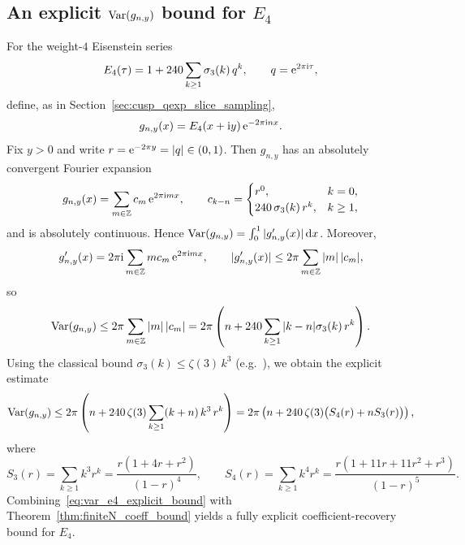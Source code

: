 \subsection{An explicit \texorpdfstring{$\mathrm{Var}(g_{n,y})$}{Var(g\_n,y)} bound for \texorpdfstring{$E_4$}{E4}}
\label{app:variation_bound_e4_explicit}

For the weight-$4$ Eisenstein series
\begin{equation}
E_4(\tau)=1+240\sum_{k\ge 1}\sigma_3(k)\,q^k,\qquad q=\mathrm{e}^{2\pi\mathrm{i}\tau},
\end{equation}
define, as in Section~\ref{sec:cusp_qexp_slice_sampling},
\begin{equation}
g_{n,y}(x)=E_4(x+\mathrm{i} y)\,\mathrm{e}^{-2\pi\mathrm{i} n x}.
\end{equation}
Fix $y>0$ and write $r=\mathrm{e}^{-2\pi y}=|q|\in(0,1)$. Then $g_{n,y}$ has an absolutely convergent Fourier expansion
\begin{equation}
g_{n,y}(x)=\sum_{m\in\mathbb{Z}} c_m\,\mathrm{e}^{2\pi\mathrm{i} m x},
\qquad
c_{k-n}=
\begin{cases}
r^0, & k=0,\\
240\,\sigma_3(k)\,r^k, & k\ge 1,
\end{cases}
\end{equation}
and is absolutely continuous. Hence $\mathrm{Var}(g_{n,y})=\int_0^1|g_{n,y}'(x)|\,\mathrm{d} x$.
Moreover,
\begin{equation}
g_{n,y}'(x)=2\pi\mathrm{i} \sum_{m\in\mathbb{Z}} m c_m\,\mathrm{e}^{2\pi\mathrm{i} m x},
\qquad
|g_{n,y}'(x)|\le 2\pi \sum_{m\in\mathbb{Z}} |m|\,|c_m|,
\end{equation}
so
\begin{equation}
\label{eq:var_bound_by_coeff_sum}
\mathrm{Var}(g_{n,y})
\le 2\pi \sum_{m\in\mathbb{Z}} |m|\,|c_m|
 = 2\pi\left(n + 240\sum_{k\ge 1}|k-n|\sigma_3(k)\,r^k\right).
\end{equation}
Using the classical bound $\sigma_3(k)\le \zeta(3)\,k^3$ (e.g.\ \cite{Apostol1990}), we obtain the explicit estimate
\begin{equation}
\label{eq:var_e4_explicit_bound}
\mathrm{Var}(g_{n,y})
\le 2\pi\left(
n
 +240\,\zeta(3)\sum_{k\ge 1}(k+n)\,k^3\,r^k
\right)
=2\pi\left(
n
 +240\,\zeta(3)\big(S_4(r)+nS_3(r)\big)
\right),
\end{equation}
where
\begin{equation}
S_3(r)=\sum_{k\ge 1}k^3r^k=\frac{r(1+4r+r^2)}{(1-r)^4},
\qquad
S_4(r)=\sum_{k\ge 1}k^4r^k=\frac{r(1+11r+11r^2+r^3)}{(1-r)^5}.
\end{equation}
Combining~\eqref{eq:var_e4_explicit_bound} with Theorem~\ref{thm:finiteN_coeff_bound} yields a fully explicit coefficient-recovery bound for $E_4$.

